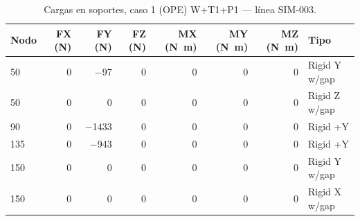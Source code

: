 \begin{table}[htbp]
  \centering
  \footnotesize
  \caption{Cargas en soportes, caso 1 (OPE) W+T1+P1 — línea SIM-003.}
  \label{tab:restricciones-ope}
  \begin{tabular}{lrrrrrrl}
    \toprule
    Nodo & FX (\si{N}) & FY (\si{N}) & FZ (\si{N}) & MX (\si{N.m}) & MY (\si{N.m}) & MZ (\si{N.m}) & Tipo \\
    \midrule
    50 & \num{0} & \num{-97} & \num{0} & \num{0} & \num{0} & \num{0} & Rigid Y w/gap \\
    50 & \num{0} & \num{0} & \num{0} & \num{0} & \num{0} & \num{0} & Rigid Z w/gap \\
    90 & \num{0} & \num{-1433} & \num{0} & \num{0} & \num{0} & \num{0} & Rigid +Y \\
    135 & \num{0} & \num{-943} & \num{0} & \num{0} & \num{0} & \num{0} & Rigid +Y \\
    150 & \num{0} & \num{0} & \num{0} & \num{0} & \num{0} & \num{0} & Rigid Y w/gap \\
    150 & \num{0} & \num{0} & \num{0} & \num{0} & \num{0} & \num{0} & Rigid X w/gap \\
    \bottomrule
  \end{tabular}
\end{table}
